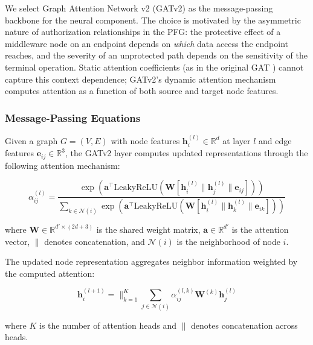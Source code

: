 We select Graph Attention Network v2 (GATv2) \cite{brody2021attentive} as the message-passing backbone for the neural component. The choice is motivated by the asymmetric nature of authorization relationships in the PFG: the protective effect of a middleware node on an endpoint depends on \emph{which} data access the endpoint reaches, and the severity of an unprotected path depends on the sensitivity of the terminal operation. Static attention coefficients (as in the original GAT \cite{velivckovic2018graph}) cannot capture this context dependence; GATv2's dynamic attention mechanism computes attention as a function of both source and target node features.

\subsubsection{Message-Passing Equations}

Given a graph $G = (V, E)$ with node features $\mathbf{h}_i^{(l)} \in \mathbb{R}^d$ at layer $l$ and edge features $\mathbf{e}_{ij} \in \mathbb{R}^3$, the GATv2 layer computes updated representations through the following attention mechanism:

\begin{equation}
\label{eq:gatv2-attention}
\alpha_{ij}^{(l)} = \frac{\exp\left(\mathbf{a}^{\top} \text{LeakyReLU}\left(\mathbf{W}\left[\mathbf{h}_i^{(l)} \| \mathbf{h}_j^{(l)} \| \mathbf{e}_{ij}\right]\right)\right)}{\sum_{k \in \mathcal{N}(i)} \exp\left(\mathbf{a}^{\top} \text{LeakyReLU}\left(\mathbf{W}\left[\mathbf{h}_i^{(l)} \| \mathbf{h}_k^{(l)} \| \mathbf{e}_{ik}\right]\right)\right)}
\end{equation}

where $\mathbf{W} \in \mathbb{R}^{d' \times (2d + 3)}$ is the shared weight matrix, $\mathbf{a} \in \mathbb{R}^{d'}$ is the attention vector, $\|$ denotes concatenation, and $\mathcal{N}(i)$ is the neighborhood of node $i$.

The updated node representation aggregates neighbor information weighted by the computed attention:

\begin{equation}
\label{eq:gatv2-update}
\mathbf{h}_i^{(l+1)} = \Big\|_{k=1}^{K} \sum_{j \in \mathcal{N}(i)} \alpha_{ij}^{(l,k)} \mathbf{W}^{(k)} \mathbf{h}_j^{(l)}
\end{equation}

where $K$ is the number of attention heads and $\|$ denotes concatenation across heads.

